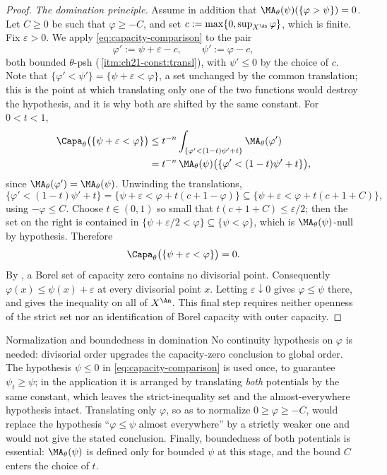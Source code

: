 \begin{proof}
\emph{The domination principle.}  Assume in addition that
$\MA_\theta(\psi)(\{\varphi>\psi\})=0$.  Let $C\geq0$
be such that $\varphi\geq-C$, and set
$c:=\max\{0,\sup_{X^{\An}}\varphi\}$, which is finite.  Fix
$\varepsilon>0$.  We apply \eqref{eq:capacity-comparison} to the pair
\[
 \varphi':=\psi+\varepsilon-c,\qquad
 \psi':=\varphi-c ,
\]
both bounded $\theta$-psh
(\,\cref{itm:ch21-const:transl}), with
$\psi'\leq0$ by the choice of $c$.  Note that
$\{\varphi'<\psi'\}=\{\psi+\varepsilon<\varphi\}$, a set unchanged by the
common translation; this is the point at which translating only one of the
two functions would destroy the hypothesis, and it is why both are shifted
by the same constant.  For $0<t<1$,
\[
 \begin{aligned}
 \Capa_\theta\bigl(\{\psi+\varepsilon<\varphi\}\bigr)
 &\leq t^{-n}
   \int_{\{\varphi'<(1-t)\psi'+t\}}\MA_\theta(\varphi')\\
 &=t^{-n}\,\MA_\theta(\psi)
   \bigl(\{\varphi'<(1-t)\psi'+t\}\bigr),
 \end{aligned}
\]
since $\MA_\theta(\varphi')=\MA_\theta(\psi)$.  Unwinding the translations,
\[
 \{\varphi'<(1-t)\psi'+t\}
 =\bigl\{\psi+\varepsilon<\varphi+t(c+1-\varphi)\bigr\}
 \subseteq\bigl\{\psi+\varepsilon<\varphi+t(c+1+C)\bigr\},
\]
using $-\varphi\leq C$.  Choose $t\in(0,1)$ so small that
$t(c+1+C)\leq\varepsilon/2$; then the set on the right is contained in
$\{\psi+\varepsilon/2<\varphi\}\subseteq\{\psi<\varphi\}$, which is
$\MA_\theta(\psi)$-null by hypothesis.  Therefore
\[
 \Capa_\theta\bigl(\{\psi+\varepsilon<\varphi\}\bigr)=0 .
\]
By , a Borel set of capacity zero
contains no divisorial point.  Consequently
$\varphi(x)\leq\psi(x)+\varepsilon$ at every divisorial point $x$.
Letting $\varepsilon\downarrow0$ gives $\varphi\leq\psi$ there, and
 gives the inequality on all of $X^{\An}$.
This final step requires neither openness of the strict set nor an
identification of Borel capacity with outer capacity.
\end{proof}

\begin{warning}{Normalization and boundedness in domination}
No continuity hypothesis on $\varphi$ is needed: divisorial order upgrades
the capacity-zero conclusion to global order.  The
hypothesis $\psi\leq0$ in \eqref{eq:capacity-comparison} is used once, to
guarantee $\psi_t\geq\psi$; in the application it is arranged by
translating \emph{both} potentials by the same constant, which leaves the
strict-inequality set and the almost-everywhere hypothesis intact.
Translating only $\varphi$, so as to normalize $0\geq\varphi\geq-C$,
would replace the hypothesis ``$\varphi\leq\psi$ almost everywhere'' by a
strictly weaker one and would not give the stated conclusion.  Finally,
boundedness of both potentials is essential: $\MA_\theta(\psi)$ is defined
only for bounded $\psi$ at this stage, and the bound $C$ enters the
choice of $t$.
\end{warning}

